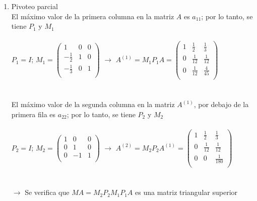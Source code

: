 \begin{enumerate}[]
    \begin{enumerate}[]
        \item Pivoteo parcial\\
        El máximo valor de la primera columna en la matriz $A$ es $a_{11}$; por lo tanto, se tiene $P_1$ y $M_1$\\
        \\
        $P_1 = I$; 
        $M_1 = \begin{pmatrix}
            1 & 0 & 0 \\ 
            -\frac{1}{2} & 1 & 0 \\
            -\frac{1}{3} & 0 & 1 \\
        \end{pmatrix} $ 
        $\xrightarrow{}$
        $A^{(1)}= M_1P_1A = \begin{pmatrix}
            1 & \frac{1}{2} & \frac{1}{3} \\ 
            0 & \frac{1}{12} & \frac{1}{12} \\
            0 & \frac{1}{12} & \frac{4}{45} \\
        \end{pmatrix}$
        \\\\\\
        El máximo valor de la segunda columna en la matriz $A^{(1)}$, por debajo de la primera fila es $a_{22}$; por lo tanto, se tiene $P_2$ y $M_2$\\
        \\
        $P_2 = I$; 
        $M_2 = \begin{pmatrix}
            1 & 0 & 0 \\ 
            0 & 1 & 0 \\
            0 & -1 & 1 \\
        \end{pmatrix} $ 
        $\xrightarrow{}$
        $A^{(2)}= M_2P_2A^{(1)} = \begin{pmatrix}
            1 & \frac{1}{2} & \frac{1}{3} \\ 
            0 & \frac{1}{12} & \frac{1}{12} \\
            0 & 0 & \frac{1}{180} \\
        \end{pmatrix}$
        \\\\\\
        $\xrightarrow{}$ Se verifica que $MA = M_2P_2M_1P_1A$ es una matriz triangular superior\\
        

\end{enumerate}
\end{enumerate}
